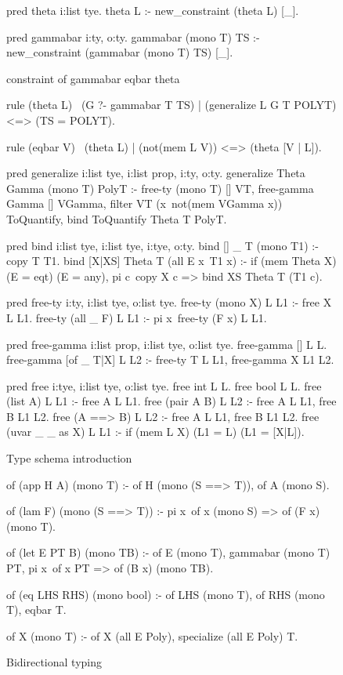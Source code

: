 \documentclass[a4paper, 11pt]{book}
\begin{document}
\begin{figure}
\begin{elpicode}
pred theta i:list tye.
theta L :- new_constraint (theta L) [_].

pred gammabar i:ty, o:ty.
gammabar (mono T) TS :- new_constraint (gammabar (mono T) TS) [_].

constraint of gammabar eqbar theta {
  rule (theta L)                    %
        \  (G ?- gammabar T TS)     %
        |  (generalize L G T POLYT) %
      <=> (TS = POLYT).             %

  rule (eqbar V) \ (theta L) | (not(mem L V)) <=> (theta [V | L]).
}

pred generalize i:list tye, i:list prop, i:ty, o:ty.
generalize Theta Gamma (mono T) PolyT :-
  free-ty (mono T) [] VT,
  free-gamma Gamma [] VGamma,
  filter VT (x\ not(mem VGamma x)) ToQuantify,
  bind ToQuantify Theta T PolyT.

pred bind i:list tye, i:list tye, i:tye, o:ty.
bind [] _ T (mono T1) :- copy T T1.
bind [X|XS] Theta T (all E x\ T1 x) :-
  if (mem Theta X) (E = eqt) (E = any),
  pi c\ copy X c => bind XS Theta T (T1 c).

pred free-ty i:ty, i:list tye, o:list tye.
free-ty (mono X) L L1 :- free X L L1.
free-ty (all _ F) L L1 :- pi x\ free-ty (F x) L L1.

pred free-gamma i:list prop, i:list tye, o:list tye.
free-gamma [] L L.
free-gamma [of _ T|X] L L2 :- free-ty T L L1, free-gamma X L1 L2.

pred free i:tye, i:list tye, o:list tye.
free int L L.
free bool L L.
free (list A) L L1 :- free A L L1.
free (pair A B) L L2 :- free A L L1, free B L1 L2.
free (A ==> B) L L2 :- free A L L1, free B L1 L2.
free (uvar _ _ as X) L L1 :- if (mem L X) (L1 = L) (L1 = [X|L]).
\end{elpicode}
\caption[schema introduction]{Type schema introduction\label{hm:intro}}
\end{figure}


\begin{figure}
\begin{elpicode}
of (app H A) (mono T) :-
  of H (mono (S ==> T)),
  of A (mono S).

of (lam F) (mono (S ==> T)) :-
  pi x\ of x (mono S) => of (F x) (mono T).

of (let E PT B) (mono TB) :-
  of E (mono T),
  gammabar (mono T) PT,
  pi x\ of x PT => of (B x) (mono TB).

of (eq LHS RHS) (mono bool) :-
  of LHS (mono T),
  of RHS (mono T),
  eqbar T.

of X (mono T) :- of X (all E Poly), specialize (all E Poly) T.
\end{elpicode}
\caption[bidirectional]{Bidirectional typing\label{hm:bidir}}
\end{figure}
\end{document}
